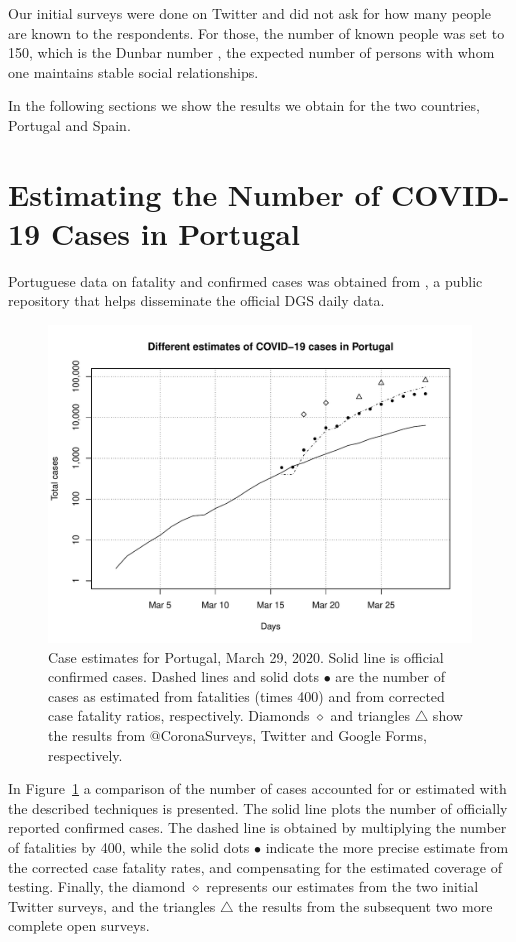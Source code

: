 \documentclass{article}
\begin{document}
Our initial surveys were done on Twitter and did not ask for how many people are known to the respondents. For those, the number of known people was set to 150, which is the Dunbar number \cite{Dunbar-wiki,dunbar2010many}, the expected number of persons with whom one maintains stable social relationships. 

In the following sections we show the results we obtain for the two countries, Portugal and Spain. 

\section{Estimating the Number of COVID-19 Cases in Portugal}

Portuguese data on fatality and confirmed cases was obtained from \cite{dssg-pt}, a public repository that helps disseminate the official DGS daily data.

\begin{figure}
\begin{center}
\includegraphics[width=0.9\linewidth]{EstPTMar29.pdf}
\end{center}
  \caption{Case estimates for Portugal, March 29, 2020. Solid line is official confirmed cases. Dashed lines and solid dots $\bullet$ are the number of cases as estimated from fatalities (times 400) and from corrected case fatality ratios, respectively. Diamonds $\diamond$ and triangles  $\triangle$ show the results from $@$CoronaSurveys, Twitter and Google Forms, respectively.}
\label{pt}
\end{figure}

In Figure~\ref{pt} a comparison of the number of cases accounted for or estimated with the described techniques is presented. The solid line plots the number of officially reported confirmed cases. The dashed line is obtained by multiplying the number of fatalities by 400, while the solid dots $\bullet$ indicate the more precise estimate from the corrected case fatality rates, and compensating for the estimated coverage of testing. Finally, the diamond $\diamond$ represents our estimates from the two initial Twitter surveys, and the triangles $\triangle$ the results from the subsequent two more complete open surveys. 
\end{document}
